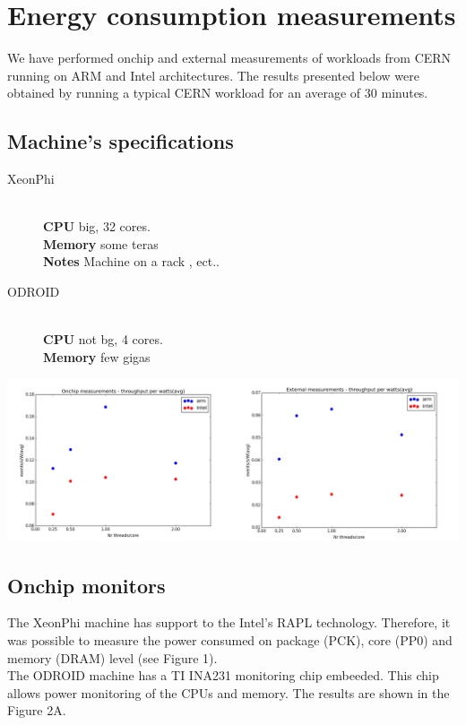 \documentclass[portrait,a1,final]{a0poster} %
\newcommand{\sectionspace}{10mm} %
\newcommand{\figurespace}{10mm} %
\begin{document}
\begin{minipage}[tc]{0.9\linewidth}
\begin{minipage}[t]{0.5\linewidth}
\vspace{\sectionspace}
\section{Energy consumption measurements}


We have performed onchip and external measurements of workloads from CERN running on ARM and Intel architectures. 
The results presented below were obtained by running a typical CERN workload for an average of 30 minutes.
\vspace{\sectionspace}
\subsection*{Machine's specifications}

\begin{description}
  \item[XeonPhi] \hfill \\
  \textbf{CPU}  big, 32 cores. \\
  \textbf{Memory} some teras\\
  \textbf{Notes}  Machine on a rack , ect..
  
  \item[ODROID] \hfill \\
   \textbf{CPU}  not bg, 4 cores. \\
  \textbf{Memory} few gigas\\
\end{description}

\vspace{\figurespace}
\begin{center}
  	\includegraphics[width=.8\linewidth]{./figs/2measurements.png}
\end{center}
\vspace{\figurespace}


\vspace{0.02\linewidth} 

\subsection{Onchip monitors}
The XeonPhi machine has support to the Intel's RAPL technology. Therefore, it was possible to measure the power consumed on package (PCK), core (PP0) and memory (DRAM) level (see Figure 1).\\
The ODROID machine has a TI INA231 monitoring chip embeeded. This chip allows power monitoring of the CPUs and memory. The results are shown in the Figure 2A.


\end{minipage}
\end{minipage}
\end{document}
